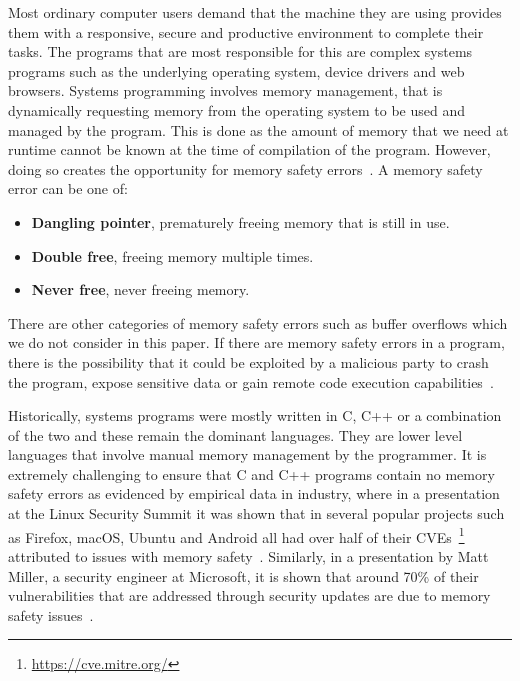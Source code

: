\documentclass{mpaper}
\begin{document}
    Most ordinary computer users demand that the machine they are using provides them with a responsive, secure and productive environment to complete their tasks.
    The programs that are most responsible for this are complex systems programs such as the underlying operating system, device drivers and web browsers.
    Systems programming involves memory management, that is dynamically requesting memory from the operating system to be used and managed by the program.
    This is done as the amount of memory that we need at runtime cannot be known at the time of compilation of the program.
    However, doing so creates the opportunity for memory safety errors~\cite{Dhurjati2003}.
    A memory safety error can be one of:
    \begin{itemize}
        \item \textbf{Dangling pointer}, prematurely freeing memory that is still in use.
        \item \textbf{Double free}, freeing memory multiple times.
        \item \textbf{Never free}, never freeing memory.
    \end{itemize}
    There are other categories of memory safety errors such as buffer overflows which we do not consider in this paper.
    If there are memory safety errors in a program, there is the possibility that it could be exploited by a malicious party to crash the program, expose sensitive data or gain remote code execution capabilities~\cite{Afek2007}.

    Historically, systems programs were mostly written in C, C++ or a combination of the two and these remain the dominant languages.
    They are lower level languages that involve manual memory management by the programmer.
    It is extremely challenging to ensure that C and C++ programs contain no memory safety errors as evidenced by empirical data in industry, where in a presentation at the Linux Security Summit it was shown that in several popular projects such as Firefox, macOS, Ubuntu and Android all had over half of their CVEs~\footnote{\url{https://cve.mitre.org/}} attributed to issues with memory safety~\cite{Gaynor2020}.
    Similarly, in a presentation by Matt Miller, a security engineer at Microsoft, it is shown that around 70\% of their vulnerabilities that are addressed through security updates are due to memory safety issues~\cite{Miller2019}. 
    
\end{document}
